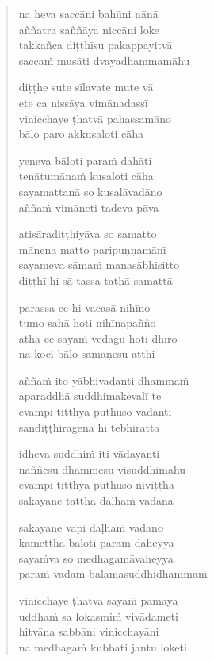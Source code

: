\begin{verse}
na heva saccāni bahūni nānā\\
aññatra saññāya niccāni loke\\
takkañca diṭṭhīsu pakappayitvā\\
saccaṁ musāti dvayadhammamāhu

diṭṭhe sute sīlavate mute vā\\
ete ca nissāya vimānadassī\\
vinicchaye ṭhatvā pahassamāno\\
bālo paro akkusaloti cāha

yeneva bāloti paraṁ dahāti\\
tenātumānaṁ kusaloti cāha\\
sayamattanā so kusalāvadāno\\
aññaṁ vimāneti tadeva pāva

atisāradiṭṭhiyāva so samatto\\
mānena matto paripuṇṇamānī\\
sayameva sāmaṁ manasābhisitto\\
diṭṭhī hi sā tassa tathā samattā

parassa ce hi vacasā nihīno\\
tumo sahā hoti nihīnapañño\\
atha ce sayaṁ vedagū hoti dhīro\\
na koci bālo samaṇesu atthi

aññaṁ ito yābhivadanti dhammaṁ\\
aparaddhā suddhimakevalī te\\
evampi titthyā puthuso vadanti\\
sandiṭṭhirāgena hi tebhirattā

idheva suddhiṁ iti vādayanti\\
nāññesu dhammesu visuddhimāhu\\
evampi titthyā puthuso niviṭṭhā\\
sakāyane tattha daḷhaṁ vadānā

sakāyane vāpi daḷhaṁ vadāno\\
kamettha bāloti paraṁ daheyya\\
sayaṁva so medhagamāvaheyya\\
paraṁ vadaṁ bālamasuddhidhammaṁ

vinicchaye ṭhatvā sayaṁ pamāya\\
uddhaṁ sa lokasmiṁ vivādameti\\
hitvāna sabbāni vinicchayāni\\
na medhagaṁ kubbati jantu loketi

\end{verse}


